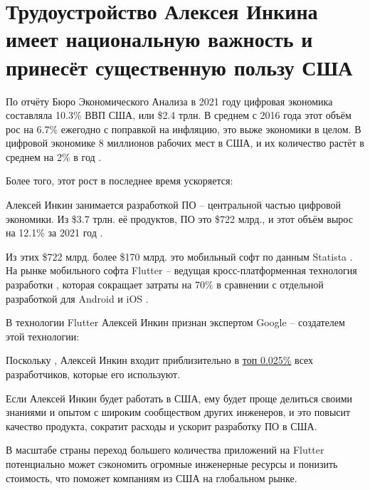 \section{%
    Трудоустройство Алексея Инкина имеет национальную важность и принесёт существенную пользу США%
}
\label{sec:Benefit}

По отчёту Бюро Экономического Анализа в 2021 году цифровая экономика составляла
10.3\% ВВП США, или \$2.4 трлн.
В среднем с 2016 года этот объём рос
на 6.7\% ежегодно с поправкой на инфляцию, это выже экономики в целом.
В цифровой экономике 8 миллионов рабочих мест в США,
и их количество растёт в среднем на 2\% в год .

Более того, этот рост в последнее время ускоряется:


Алексей Инкин занимается разработкой ПО -- центральной частью цифровой экономики.
Из \$3.7 трлн. её продуктов, ПО это \$722 млрд.,
и этот объём вырос на 12.1\% за 2021 год .

Из этих \$722 млрд. более \$170 млрд. это мобильный софт по данным Statista .
На рынке мобильного софта Flutter -- ведущая кросс-платформенная технология разработки ,
которая сокращает затраты на 70\% в сравнении с отдельной разработкой для Android и iOS .

В технологии Flutter Алексей Инкин признан экспертом Google -- создателем этой технологии:


Поскольку ,
Алексей Инкин входит приблизительно в \ul{топ 0.025\%} всех разработчиков, которые его используют.

Если Алексей Инкин будет работать в США, ему будет проще делиться своими знаниями и опытом
с широким сообществом других инженеров, и это повысит качество продукта, сократит расходы и ускорит
разработку ПО в США.

В масштабе страны переход большего количества приложений на Flutter потенциально может сэкономить огромные
инженерные ресурсы и понизить стоимость, что поможет компаниям из США на глобальном рынке.

